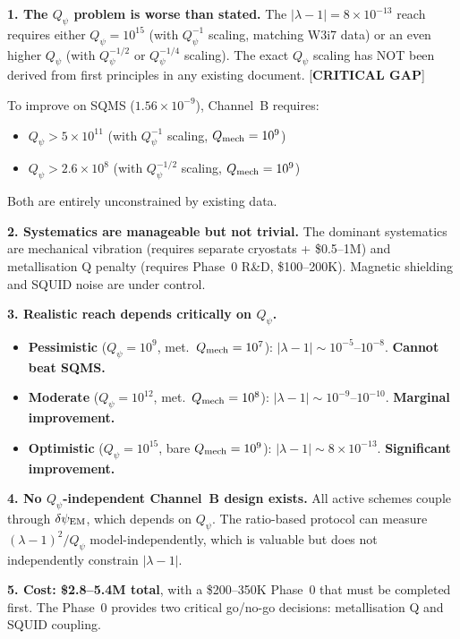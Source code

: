 \documentclass[11pt]{article}
\newcommand{\lam}{\lambda}
\newcommand{\ee}[1]{\times 10^{#1}}
\newcommand{\Qpsi}{Q_\psi}
\newcommand{\Qmech}{Q_{\rm mech}}
\newcommand{\lbone}{|\lam - 1|}
\newcommand{\dpsiEM}{\delta\psi_{\rm EM}}
\theoremstyle{definition}
\theoremstyle{remark}
\begin{document}
\begin{tcolorbox}[colback=blue!5!white, colframe=blue!60!black,
  title=\textbf{W3i9 CHANNEL~B AUDIT: FINAL VERDICT}, breakable]

\textbf{1. The $\Qpsi$ problem is worse than stated.}
The $\lbone = 8\ee{-13}$ reach requires either $\Qpsi = 10^{15}$
(with $\Qpsi^{-1}$ scaling, matching W3i7 data) or an even higher
$\Qpsi$ (with $\Qpsi^{-1/2}$ or $\Qpsi^{-1/4}$ scaling). The exact
$\Qpsi$ scaling has NOT been derived from first principles in any
existing document. [\textbf{CRITICAL GAP}]

To improve on SQMS ($1.56\ee{-9}$), Channel~B requires:
\begin{itemize}[nosep]
\item $\Qpsi > 5\ee{11}$ (with $\Qpsi^{-1}$ scaling, $\Qmech = 10^9$)
\item $\Qpsi > 2.6\ee{8}$ (with $\Qpsi^{-1/2}$ scaling, $\Qmech = 10^9$)
\end{itemize}
Both are entirely unconstrained by existing data.

\textbf{2. Systematics are manageable but not trivial.}
The dominant systematics are mechanical vibration (requires separate
cryostats + \$0.5--1M) and metallisation Q penalty (requires Phase~0
R\&D, \$100--200K). Magnetic shielding and SQUID noise are under control.

\textbf{3. Realistic reach depends critically on $\Qpsi$.}
\begin{itemize}[nosep]
\item \textbf{Pessimistic} ($\Qpsi = 10^9$, met.\ $\Qmech = 10^7$):
  $\lbone \sim 10^{-5}$--$10^{-8}$. \textbf{Cannot beat SQMS.}
\item \textbf{Moderate} ($\Qpsi = 10^{12}$, met.\ $\Qmech = 10^8$):
  $\lbone \sim 10^{-9}$--$10^{-10}$. \textbf{Marginal improvement.}
\item \textbf{Optimistic} ($\Qpsi = 10^{15}$, bare $\Qmech = 10^9$):
  $\lbone \sim 8\ee{-13}$. \textbf{Significant improvement.}
\end{itemize}

\textbf{4. No $\Qpsi$-independent Channel~B design exists.}
All active schemes couple through $\dpsiEM$, which depends on $\Qpsi$.
The ratio-based protocol can measure $(\lam-1)^2/\Qpsi$
model-independently, which is valuable but does not independently
constrain $\lbone$.

\textbf{5. Cost: \$2.8--5.4M total}, with a \$200--350K Phase~0
that must be completed first. The Phase~0 provides two critical
go/no-go decisions: metallisation Q and SQUID coupling.


\end{tcolorbox}
\end{document}
